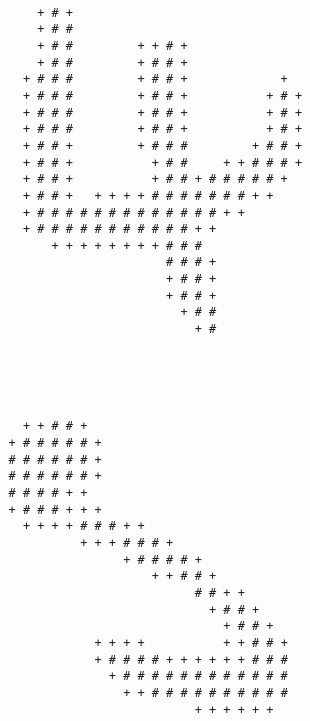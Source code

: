 \begin{multicols*}{2}
\begin{Verbatim}[samepage=true]
                                                        
\end{Verbatim}
\begin{Verbatim}[samepage=true]
                                                        
                                                        
                                                        
              + # +                                     
              + # #                                     
              + # #         + + # +                     
              + # #         + # # +                     
            + # # #         + # # +             +       
            + # # #         + # # +           + # +     
            + # # #         + # # +           + # +     
            + # # #         + # # +           + # +     
            + # # +         + # # #         + # # +     
            + # # +           + # #     + + # # # +     
            + # # +           + # # + # # # # # +       
            + # # +   + + + + # # # # # # # + +         
            + # # # # # # # # # # # # # + +             
            + # # # # # # # # # # # + +                 
                + + + + + + + + # # #                   
                                # # # +                 
                                + # # +                 
                                + # # +                 
                                  + # #                 
                                    + #                 
                                                        
                                                        
\end{Verbatim}
\begin{Verbatim}[samepage=true]
                                                        
                                                        
            + + # # +                                   
          + # # # # # +                                 
          # # # # # # +                                 
          # # # # # # +                                 
          # # # # + +                                   
          + # # # + + +                                 
            + + + + # # # + +                           
                    + + + # # # +                       
                          + # # # # +                   
                              + + # # +                 
                                    # # + +             
                                      + # # +           
                                        + # # +         
                      + + + +           + + # # +       
                      + # # # # + + + + + + # # #       
                        + # # # # # # # # # # # #       
                          + + # # # # # # # # # #       
                                    + + + + + +         
                                                        

\end{Verbatim}
\end{multicols*}
